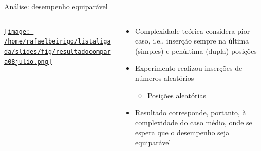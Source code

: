 \documentclass[bigger]{beamer}
\begin{document}
\begin{frame}[label=sec-3-1-8]{Análise: desempenho equiparável}
\begin{columns}
\begin{column}{0.65\textwidth}
\begin{center}
\href{fig/resultadocompara08julio.png}{\texttt{[image: /home/rafaelbeirigo/listaligada/slides/fig/resultadocompara08julio.png]}}
\end{center}
\end{column}
\begin{column}{0.35\textwidth}
\scriptsize
\begin{itemize}
\item Complexidade teórica considera \alert{pior} caso, i.e., inserção sempre na
última (simples) e penúltima (dupla) posições
\item Experimento realizou inserções de números aleatórios
\begin{itemize}
\item \scriptsize Posições aleatórias
\end{itemize}
\item Resultado corresponde, portanto, à complexidade do \alert{caso médio},
onde se espera que o desempenho seja equiparável
\end{itemize}
\end{column}
\end{columns}
\end{frame}
\end{document}
